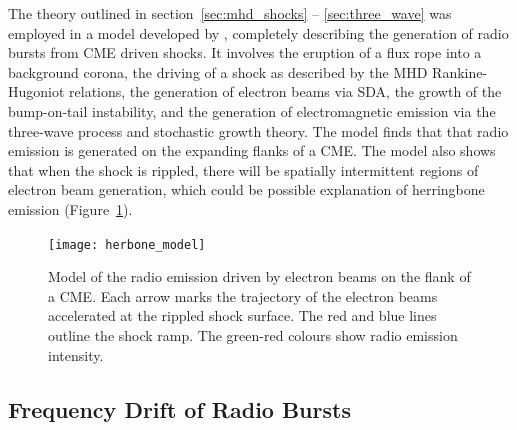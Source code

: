The theory outlined in section~\ref{sec:mhd_shocks} -- \ref{sec:three_wave} was employed in a model developed by \citet{schmidt2012b}, completely describing the generation of radio bursts from CME driven shocks. It involves the eruption of a flux rope into a background corona, the driving of a shock as described by the MHD Rankine-Hugoniot relations, the generation of electron beams via SDA, the growth of the bump-on-tail instability, and the generation of electromagnetic emission via the three-wave process and stochastic growth theory. The model finds that that radio emission is generated on the expanding flanks of a CME. The model also shows that when the shock is rippled, there will be spatially intermittent regions of electron beam generation, which could be possible explanation of herringbone emission (Figure~\ref{fig:herbone_model}).
\begin{figure}[t!]
\begin{center}
\texttt{[image: herbone\_model]}
\caption[Model of radio burst driven by expanding CME flanks]{Model of the radio emission driven by electron beams on the flank of a CME. Each arrow marks the trajectory of the electron beams accelerated at the rippled shock surface. The red and blue lines outline the shock ramp. The green-red colours show radio emission intensity.}
\label{fig:herbone_model}
\end{center}
\end{figure}


\subsection{Frequency Drift of Radio Bursts}\label{sec:freq_drift}

